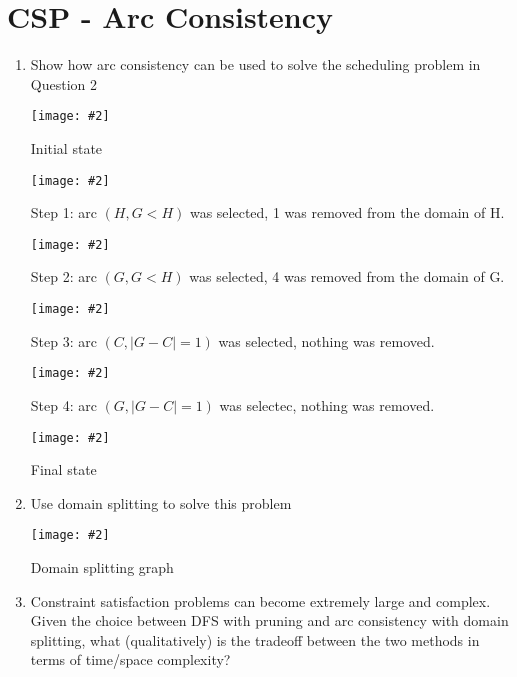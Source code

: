 \documentclass{article}
\def\ans#1{{\color{ans}#1}}
\newcommand{\centerfig}[2]{\begin{center}\texttt{[image: \#2]}\end{center}}
\begin{document}
\section{CSP - Arc Consistency}
\begin{enumerate}[label=(\alph*)]
    \item Show how arc consistency can be used to solve the scheduling problem in Question 2
    \centerfig{0.7}{../figs/q3_a_1.jpeg}
    {
        \begin{center}\color{ans}
            Initial state
        \end{center}
    }
    \centerfig{0.7}{../figs/q3_a_2.jpeg}
    {
        \begin{center}\color{ans}
            Step 1: arc $(H, G<H)$ was selected, 1 was removed from the domain of H.
        \end{center}
    }
    \centerfig{0.7}{../figs/q3_a_3.jpeg}
    {
        \begin{center}\color{ans}
            Step 2: arc $(G, G<H)$ was selected, 4 was removed from the domain of G.
        \end{center}
    }
    \centerfig{0.7}{../figs/q3_a_4.jpeg}
    {
        \begin{center}\color{ans}
            Step 3: arc $(C, |G-C|=1)$ was selected, nothing was removed.
        \end{center}
    }
    \centerfig{0.7}{../figs/q3_a_2.jpeg}
    {
        \begin{center}\color{ans}
            Step 4: arc $(G, |G-C|=1)$ was selectec, nothing was removed.
        \end{center}
    }
    \centerfig{0.7}{../figs/q3_a_6.jpeg}
    {
        \begin{center}\color{ans}
            Final state
        \end{center}
    }
    \item Use domain splitting to solve this problem
    \centerfig{0.8}{../figs/q3_b.png}
    {
        \begin{center}\color{ans}
            Domain splitting graph
        \end{center}
    }
    \item Constraint satisfaction problems can become extremely large and complex. Given the choice between DFS with pruning and arc consistency with domain splitting, what (qualitatively) is the tradeoff between the two methods in terms of time/space complexity? \\ \\
    \ans{
}
\end{enumerate}
\end{document}
